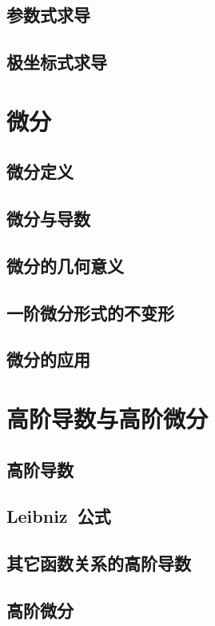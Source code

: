 \subsection{参数式求导}
\subsection{极坐标式求导}
\begin{exercise}
\item
\end{exercise}
\section{微\emspace 分}
\subsection{微分定义}
\subsection{微分与导数}
\subsection{微分的几何意义}
\subsection{一阶微分形式的不变形}
\subsection{微分的应用}
\begin{exercise}
\item
\end{exercise}
\section{高阶导数与高阶微分}
\subsection{高阶导数}
\subsection{Leibniz~公式}
\subsection{其它函数关系的高阶导数}
\subsection{高阶微分}
\begin{exercise}
\item
\end{exercise}
\begin{exercise*}
\item
\end{exercise*}


\endinput
